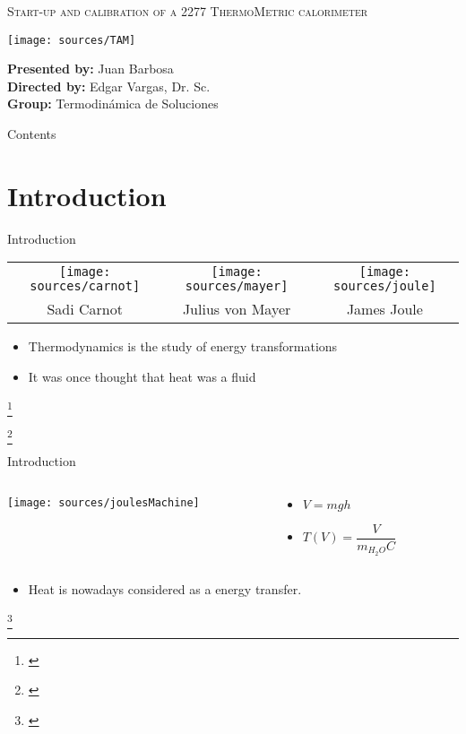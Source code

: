 \documentclass[handout]{beamer}
\newcommand\blfootnote[1]
{%
	\begingroup
	\renewcommand\thefootnote{}\footnote{#1}%
	\addtocounter{footnote}{-1}%
	\endgroup
}
\newcommand{\fcite}[1]{\blfootnote{\cite{#1}}}
\begin{document}
	\begin{frame}
		\centering
		\textsc{\Large Start-up and calibration of a 2277 ThermoMetric calorimeter}
		\begin{center}
			\texttt{[image: sources/TAM]}
		\end{center}
		\vspace{0.2cm}
		\raggedleft \textbf{Presented by:} Juan Barbosa\\
		\raggedleft \textbf{Directed by:} Edgar Vargas, Dr. Sc.\\
		\raggedleft \textbf{Group:} Termodin\'amica de Soluciones
	\end{frame}

\begin{frame}{Contents}
	\tableofcontents
\end{frame}

\section{Introduction}
\begin{frame}{Introduction}
	\begin{table}[h]
		\centering
		\begin{tabular}{ccc}
			\texttt{[image: sources/carnot]} & 
			\texttt{[image: sources/mayer]} & 
			\texttt{[image: sources/joule]}\\
			Sadi Carnot & Julius von Mayer & James Joule	
		\end{tabular}
	\end{table}
	\begin{itemize}
		\item Thermodynamics is the study of energy transformations
		\item It was once thought that heat was a fluid
	\end{itemize}
	\fcite{feynman2011feynman}
	\fcite{fermi1986}
\end{frame}

\begin{frame}{Introduction}
	\begin{columns}
		\begin{column}{0.5\textwidth}
			\texttt{[image: sources/joulesMachine]}
		\end{column}
		\begin{column}{0.5\textwidth}
			\begin{itemize}
				\item $V = mgh$
				\item $T(V) = \dfrac{V}{m_{H_2O}C}$
			\end{itemize}
		\end{column}
	\end{columns}
	\begin{itemize}
		\item Heat is nowadays considered as a energy transfer.
	\end{itemize}
	\fcite{feynman2011feynman}
\end{frame}
\end{document}
